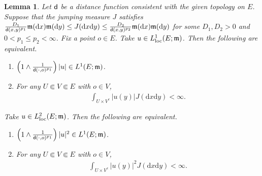 \documentclass[12pt,a4paper]{article}
\newtheorem{lem}[thm]{Lemma}
\renewcommand{\d}{\mathrm{d}}
\newcommand{\m}{\mathfrak{m} }
\newcommand{\loc}{{\rm loc}}
\newcommand{\1}{{\bf 1}}
\begin{document}
\begin{lem}\label{lem:intgrabilityequivalence2}
Let ${\sf d}$ be a distance function consistent with the given topology on 
 $E$.
Suppose that the jumping measure $J$ satisfies 
$\frac{D_1}{{\sf d}(x,y)^{p_1}}{\m}({\d} x){\m}({\d} y)\leq
J({\d} x{\d} y)\leq \frac{D_2}{{\sf d}(x,y)^{p_2}}{\m}({\d} x){\m}({\d} y)$ for some $D_1,D_2>0$ and $0<p_1\leq p_2<\infty$. 
Fix a point $o\in E$. Take $u\in L^1_{\loc}(E;{\m})$. Then the following are equivalent. 
\begin{enumerate}
\item[\rm(1)] $\left(1\land \frac{1}{{\sf d}(\cdot,o)^{p_1}} \right)|u|\in L^1(E;{\m})$.
\item[\rm(2)] For any $U\Subset V\Subset E$ with $o\in V$, 
\begin{align*}
\int_{U\times V^c}|u(y)|J({\d} x{\d} y)
<\infty.
\end{align*} 
\end{enumerate}
Take $u\in L^2_{\loc}(E;{\m})$. Then the following are equivalent. 
\begin{enumerate}
\item[\rm(3)] $\left(1\land \frac{1}{{\sf d}(\cdot,o)^{p_1}} \right)|u|^2\in L^1(E;{\m})$.
\item[\rm(4)] For any $U\Subset V\Subset E$  with $o\in V$, 
\begin{align*}
\int_{U\times V^c}|u(y)|^2J({\d} x{\d} y)
<\infty.
\end{align*} 
\end{enumerate}
\end{lem}
\end{document}
